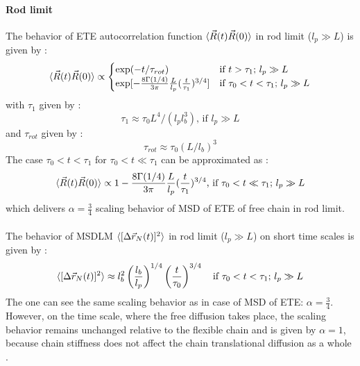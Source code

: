 \documentclass[
    paper=A4,pagesize=automedia,fontsize=12pt,
    BCOR=15mm,DIV=22,
    twoside,headinclude,footinclude=false,
    fleqn,             %
    bibliography=totocnumbered,          %
    listof=totoc,                %
    listof=flat,                 %
    cleardoublepage=empty      %
    numbers=endperiod
]{scrartcl}
\begin{document}
\paragraph{Rod limit}
The behavior of ETE autocorrelation function $\langle\vec{R}(t)\vec{R}(0)\rangle$
in rod limit ($l_p \gg L$) is given by \cite{Nikoubashman2016}:
\begin{equation} \label{eq:autocorr_ete_rod_limit}
    \langle\vec{R}(t)\vec{R}(0)\rangle \propto \begin{cases}
    \exp(-t/\tau_{rot}) & \text{if } t > \tau_1 \text{; } l_p \gg L \\
    \exp[-\frac{8 \Gamma(1/4)}{3 \pi}\frac{L}{l_p}(\frac{t}{\tau_1})^{3/4}] & \text{if } \tau_0 < t < \tau_1 \text{; } l_p \gg L
    \end{cases}
\end{equation}
with $\tau_1$ given by \cite{Nikoubashman2016}:
\begin{equation}
    \tau_1 \approx \tau_0 L^4 / (l_p l_b^3) \text{, if } l_p \gg L
\end{equation}
and $\tau_{rot}$ given by \cite{Nikoubashman2016}: 
\begin{equation}
    \tau_{rot} \approx \tau_0 (L/l_b)^3
\end{equation}
The case $\tau_0 < t < \tau_1$ for $\tau_0 < t \ll \tau_1$ can be approximated as \cite{Nikoubashman2016}:
\begin{equation}
    \langle\vec{R}(t)\vec{R}(0)\rangle \propto 1-\frac{8 \Gamma(1/4)}{3 \pi}\frac{L}{l_p}(\frac{t}{\tau_1})^{3/4} \text{, if } \tau_0 < t \ll \tau_1 \text{; } l_p \gg L 
\end{equation}
which delivers $\alpha = \frac{3}{4}$ scaling behavior of MSD of ETE of free 
chain in rod limit.
\\
\\
The behavior of MSDLM $\langle[\Delta \vec{r}_N(t)]^2\rangle$
in rod limit ($l_p \gg L$) on short time scales 
is given by \cite{Nikoubashman2016}:
\begin{equation}
    \langle[\Delta \vec{r}_N(t)]^2\rangle \approx l_b^2\left(\frac{l_b}{l_p}\right)^{1/4}\left(\frac{t}{\tau_0}\right)^{3/4} \quad \text{if } \tau_0 < t < \tau_1 \text{; } l_p \gg L
\end{equation}
The one can see the same scaling behavior as in case of MSD of ETE: $\alpha=\frac{3}{4}$.
However, on the time scale, where the free diffusion takes place, the scaling
behavior remains unchanged relative to the flexible chain and is given by 
$\alpha=1$, because chain stiffness does not affect the chain translational 
diffusion as a whole \cite{Nikoubashman2016}.
\end{document}
